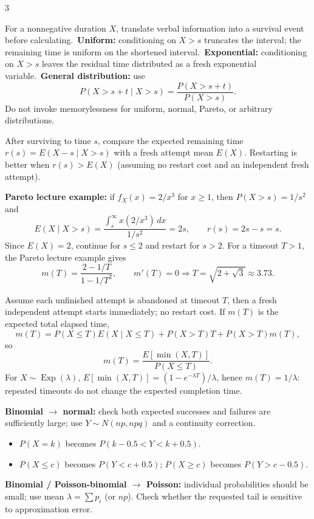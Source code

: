 \documentclass[10pt]{article}
\newcommand{\boxstart}[1]{\begin{tcolorbox}[title={#1},sharp corners]}
\newcommand{\boxend}{\end{tcolorbox}}
\begin{document}
\begin{multicols*}{3}
	\boxstart{L6 — Conditional survival templates}
	For a nonnegative duration $X$, translate verbal information into a survival event before calculating.\
	\textbf{Uniform:} conditioning on $X>s$ truncates the interval; the remaining time is uniform on the shortened interval.\
	\textbf{Exponential:} conditioning on $X>s$ leaves the residual time distributed as a fresh exponential variable.\
	\textbf{General distribution:} use
	\[
		P(X>s+t\mid X>s)=\frac{P(X>s+t)}{P(X>s)}.
	\]
	Do not invoke memorylessness for uniform, normal, Pareto, or arbitrary distributions.
	\boxend

	\boxstart{L6 — Waiting vs restarting}
	After surviving to time $s$, compare the expected remaining time $r(s)=E(X-s\mid X>s)$ with a fresh attempt mean $E(X)$. Restarting is better when $r(s)>E(X)$ (assuming no restart cost and an independent fresh attempt).

	\textbf{Pareto lecture example:} if $f_X(x)=2/x^3$ for $x\ge1$, then $P(X>s)=1/s^2$ and
	\[
		E(X\mid X>s)=\frac{\int_s^\infty x(2/x^3)\,dx}{1/s^2}=2s,
		\qquad r(s)=2s-s=s.
	\]
	Since $E(X)=2$, continue for $s\le2$ and restart for $s>2$.
	For a timeout $T>1$, the Pareto lecture example gives
	\[
		m(T)=\frac{2-1/T}{1-1/T^2},\qquad
		m'(T)=0\Longrightarrow T=\sqrt{2+\sqrt3}\approx3.73.
	\]
	\boxend

	\boxstart{L6 — Repeated timeout identity}
	Assume each unfinished attempt is abandoned at timeout $T$, then a fresh independent attempt starts immediately; no restart cost. If $m(T)$ is the expected total elapsed time,
	\[
		m(T)=P(X\le T)E(X\mid X\le T)+P(X>T)T+P(X>T)m(T),
	\]
	so
	\[
		\boxed{m(T)=\frac{E[\min(X,T)]}{P(X\le T)}}.
	\]
	For $X\sim\operatorname{Exp}(\lambda)$, $E[\min(X,T)]=(1-e^{-\lambda T})/\lambda$, hence $m(T)=1/\lambda$: repeated timeouts do not change the expected completion time.
	\boxend

	\boxstart{L5/L6 — Approximation decision rules}
	\textbf{Binomial $\to$ normal:} check both expected successes and failures are sufficiently large; use $Y\sim N(np,npq)$ and a continuity correction.
	\begin{itemize}
		\item $P(X=k)$ becomes $P(k-0.5<Y<k+0.5)$.
		\item $P(X\le c)$ becomes $P(Y<c+0.5)$; $P(X\ge c)$ becomes $P(Y>c-0.5)$.
	\end{itemize}
	\textbf{Binomial / Poisson-binomial $\to$ Poisson:} individual probabilities should be small; use mean $\lambda=\sum p_i$ (or $np$). Check whether the requested tail is sensitive to approximation error.
	\boxend


\end{multicols*}
\end{document}
